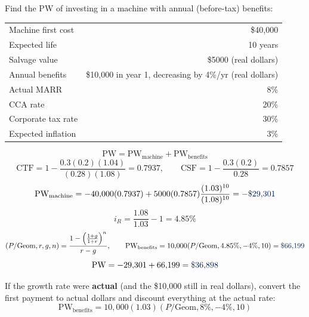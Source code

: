 \begin{example}
    Find the PW of investing in a machine with annual (before-tax) benefits:
    \begin{center}
    \begin{tabular}{lr}
        \toprule
        Machine first cost & \$40,000 \\
        Expected life & 10 years \\
        Salvage value & \$5000 (real dollars) \\
        Annual benefits & \$10,000 in year 1, decreasing by 4\%/yr (real dollars) \\
        Actual MARR & 8\% \\
        CCA rate & 20\% \\
        Corporate tax rate & 30\% \\
        Expected inflation & 3\% \\
        \bottomrule
    \end{tabular}
    \end{center}
    \[\text{PW} = \text{PW}_{\text{machine}} + \text{PW}_{\text{benefits}}\]
    \[\text{CTF} = 1 - \frac{0.3(0.2)(1.04)}{(0.28)(1.08)} = 0.7937, \qquad \text{CSF} = 1 - \frac{0.3(0.2)}{0.28} = 0.7857\]
    \[\text{PW}_{\text{machine}} = -40{,}000(0.7937) + 5000(0.7857)\frac{(1.03)^{10}}{(1.08)^{10}} = \db{-\$29{,}301}\]
    \[i_R = \frac{1.08}{1.03} - 1 = 4.85\%\]
    \[(P/\text{Geom},r,g,n) = \frac{1 - \left(\frac{1 + g}{1 + r}\right)^n}{r - g}, \qquad \text{PW}_{\text{benefits}} = 10{,}000(P/\text{Geom},4.85\%,-4\%,10) = \db{\$66{,}199}\]
    \[\text{PW} = -29{,}301 + 66{,}199 = \db{\$36{,}898}\]
\end{example}

\begin{remark}
    If the growth rate were \textbf{actual} (and the \$10,000 still in real
    dollars), convert the first payment to actual dollars and discount
    everything at the actual rate:
    \[\text{PW}_{\text{benefits}} = 10{,}000(1.03)(P/\text{Geom},8\%,-4\%,10)\]
\end{remark}

